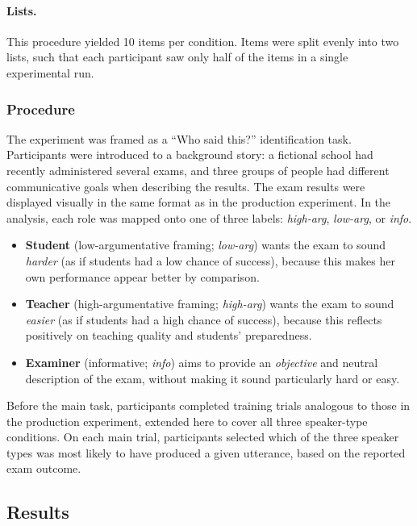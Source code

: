 \documentclass[11pt]{article}
\begin{document}
\paragraph{Lists.}
This procedure yielded 10 items per condition.
Items were split evenly into two lists, such that each participant saw only half of the items in a single experimental run.

\subsubsection{Procedure}
The experiment was framed as a ``Who said this?'' identification task.
Participants were introduced to a background story: a fictional school had recently administered several exams, and three groups of people had different communicative goals when describing the results.
The exam results were displayed visually in the same format as in the production experiment.
In the analysis, each role was mapped onto one of three labels: \emph{high-arg}, \emph{low-arg}, or \emph{info}. 

\begin{itemize}
	\item \textbf{Student} (low-argumentative framing; \emph{low-arg}) wants the exam to sound \emph{harder} (as if students had a low chance of success), because this makes her own performance appear better by comparison.
	\item \textbf{Teacher} (high-argumentative framing; \emph{high-arg}) wants the exam to sound \emph{easier} (as if students had a high chance of success), because this reflects positively on teaching quality and students' preparedness.
	\item \textbf{Examiner} (informative; \emph{info}) aims to provide an \emph{objective} and neutral description of the exam, without making it sound particularly hard or easy.
\end{itemize}

Before the main task, participants completed training trials analogous to those in the production experiment, extended here to cover all three speaker-type conditions.
On each main trial, participants selected which of the three speaker types was most likely to have produced a given utterance, based on the reported exam outcome.

\subsection{Results}
\end{document}
